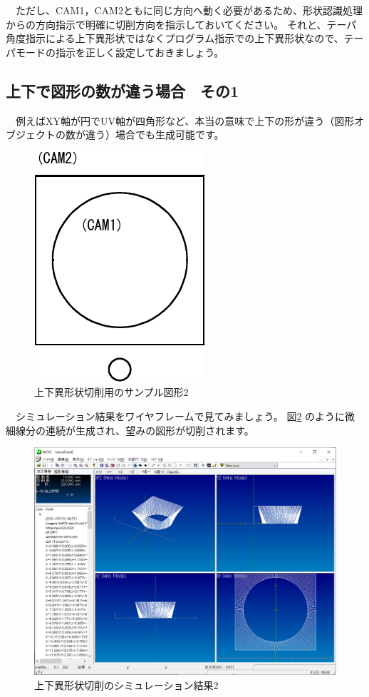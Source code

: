　ただし、CAM1，CAM2ともに同じ方向へ動く必要があるため、形状認識処理からの方向指示で明確に切削方向を指示しておいてください。
それと、テーパ角度指示による上下異形状ではなくプログラム指示での上下異形状なので、テーパモードの指示を正しく設定しておきましょう。

\subsection{上下で図形の数が違う場合　その1}
　例えばXY軸が円でUV軸が四角形など、本当の意味で上下の形が違う（図形オブジェクトの数が違う）場合でも生成可能です。

\begin{figure}[H]
\centering
\includegraphics{No2/fig/sample3-crop.pdf}
\caption{上下異形状切削用のサンプル図形2}
\label{fig:sample3.pdf}
\end{figure}

　シミュレーション結果をワイヤフレームで見てみましょう。
図\ref{fig:simu3.png} のように微細線分の連続が生成され、望みの図形が切削されます。

\begin{figure}[H]
\centering
\includegraphics[scale=0.5]{No2/fig/simu3.png}
\caption{上下異形状切削のシミュレーション結果2}
\label{fig:simu3.png}
\end{figure}

